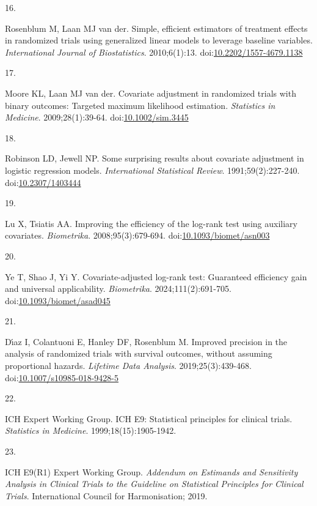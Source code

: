 \documentclass[
  11pt,
]{article}
\newlength{\cslhangindent}
\newlength{\csllabelwidth}
\newenvironment{CSLReferences}[2] %
 {\begin{list}{}{%
  \setlength{\itemindent}{0pt}
  \setlength{\leftmargin}{0pt}
  \setlength{\parsep}{0pt}
  \ifodd #1
   \setlength{\leftmargin}{\cslhangindent}
   \setlength{\itemindent}{-1\cslhangindent}
  \fi
  \setlength{\itemsep}{#2\baselineskip}}}
 {\end{list}}
\newcommand{\CSLLeftMargin}[1]{\parbox[t]{\csllabelwidth}{\strut#1\strut}}
\newcommand{\CSLRightInline}[1]{\parbox[t]{\linewidth - \csllabelwidth}{\strut#1\strut}}
\begin{document}
\begin{CSLReferences}{0}{1}
\CSLLeftMargin{16. }%
\CSLRightInline{Rosenblum M, Laan MJ van der. Simple, efficient estimators of treatment effects in randomized trials using generalized linear models to leverage baseline variables. \emph{International Journal of Biostatistics}. 2010;6(1):13. doi:\href{https://doi.org/10.2202/1557-4679.1138}{10.2202/1557-4679.1138}}

\CSLLeftMargin{17. }%
\CSLRightInline{Moore KL, Laan MJ van der. Covariate adjustment in randomized trials with binary outcomes: Targeted maximum likelihood estimation. \emph{Statistics in Medicine}. 2009;28(1):39-64. doi:\href{https://doi.org/10.1002/sim.3445}{10.1002/sim.3445}}

\CSLLeftMargin{18. }%
\CSLRightInline{Robinson LD, Jewell NP. Some surprising results about covariate adjustment in logistic regression models. \emph{International Statistical Review}. 1991;59(2):227-240. doi:\href{https://doi.org/10.2307/1403444}{10.2307/1403444}}

\CSLLeftMargin{19. }%
\CSLRightInline{Lu X, Tsiatis AA. Improving the efficiency of the log-rank test using auxiliary covariates. \emph{Biometrika}. 2008;95(3):679-694. doi:\href{https://doi.org/10.1093/biomet/asn003}{10.1093/biomet/asn003}}

\CSLLeftMargin{20. }%
\CSLRightInline{Ye T, Shao J, Yi Y. Covariate-adjusted log-rank test: Guaranteed efficiency gain and universal applicability. \emph{Biometrika}. 2024;111(2):691-705. doi:\href{https://doi.org/10.1093/biomet/asad045}{10.1093/biomet/asad045}}

\CSLLeftMargin{21. }%
\CSLRightInline{Dı́az I, Colantuoni E, Hanley DF, Rosenblum M. Improved precision in the analysis of randomized trials with survival outcomes, without assuming proportional hazards. \emph{Lifetime Data Analysis}. 2019;25(3):439-468. doi:\href{https://doi.org/10.1007/s10985-018-9428-5}{10.1007/s10985-018-9428-5}}

\CSLLeftMargin{22. }%
\CSLRightInline{ICH Expert Working Group. {ICH} {E9}: Statistical principles for clinical trials. \emph{Statistics in Medicine}. 1999;18(15):1905-1942.}

\CSLLeftMargin{23. }%
\CSLRightInline{ICH E9(R1) Expert Working Group. \emph{Addendum on Estimands and Sensitivity Analysis in Clinical Trials to the Guideline on Statistical Principles for Clinical Trials}. International Council for Harmonisation; 2019.}


\end{CSLReferences}
\end{document}
